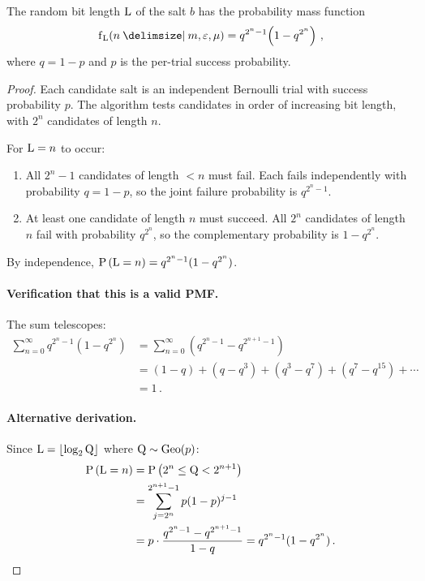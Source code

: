 \begin{theorem}
\label{thm:pmf_detailed}
The random bit length $\mathrm{L}$ of the salt $b$ has the probability mass
function
\begin{equation}
    \PDF{n \Given m, \fprate, \mu}[\RV{L}]
    = q^{2^n - 1}\!\left(1 - q^{2^n}\right)\,,
\end{equation}
where $q = 1 - p$ and $p$ is the per-trial success probability.
\end{theorem}
\begin{proof}
Each candidate salt is an independent Bernoulli trial with success probability
$p$.
The algorithm tests candidates in order of increasing bit length, with $2^n$
candidates of length $n$.

For $\mathrm{L} = n$ to occur:
\begin{enumerate}
    \item All $2^n - 1$ candidates of length $< n$ must fail.
    Each fails independently with probability $q = 1 - p$, so the joint
    failure probability is $q^{2^n - 1}$.

    \item At least one candidate of length $n$ must succeed.
    All $2^n$ candidates of length $n$ fail with probability $q^{2^n}$, so
    the complementary probability is $1 - q^{2^n}$.
\end{enumerate}
By independence, $\Prob{\RV{L} = n} = q^{2^n - 1}(1 - q^{2^n})$.

\paragraph{Verification that this is a valid PMF.}
The sum telescopes:
\begin{align}
    \sum_{n=0}^{\infty} q^{2^n - 1}(1 - q^{2^n})
    &= \sum_{n=0}^{\infty} \left(q^{2^n - 1} - q^{2^{n+1} - 1}\right) \\
    &= (1 - q) + (q - q^3) + (q^3 - q^7) + (q^7 - q^{15}) + \cdots \\
    &= 1\,.
\end{align}

\paragraph{Alternative derivation.}
Since $\mathrm{L} = \lfloor \log_2 \mathrm{Q} \rfloor$ where
$\mathrm{Q} \sim \mathrm{Geo}(p)$:
\begin{align}
    \Prob{\RV{L} = n}
    &= \Prob{2^n \leq \RV{Q} < 2^{n+1}} \\
    &= \sum_{j=2^n}^{2^{n+1}-1} p(1-p)^{j-1} \\
    &= p \cdot \frac{q^{2^n - 1} - q^{2^{n+1} - 1}}{1 - q}
    = q^{2^n - 1}(1 - q^{2^n})\,.
\end{align}
\end{proof}

